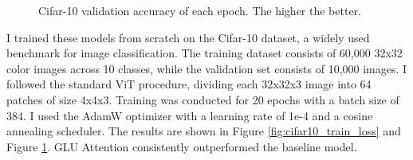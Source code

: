 \documentclass[11pt]{article}
\begin{document}
\begin{figure}[htbp]
\begin{minipage}{0.49\textwidth}
        \caption{Cifar-10 validation accuracy of each epoch. The higher the better.}
        \label{fig:cifar10_val_acc}
    \end{minipage}
\end{figure}

I trained these models from scratch on the Cifar-10 dataset, a widely used benchmark for image classification. The training dataset consists of 60,000 32x32 color images across 10 classes, while the validation set consists of 10,000 images. I followed the standard ViT\cite{dosovitskiy2021imageworth16x16words} procedure, dividing each 32x32x3 image into 64 patches of size 4x4x3. Training was conducted for 20 epochs with a batch size of 384. I used the AdamW optimizer with a learning rate of 1e-4 and a cosine annealing scheduler. The results are shown in Figure \ref{fig:cifar10_train_loss} and Figure \ref{fig:cifar10_val_acc}. GLU Attention consistently outperformed the baseline model.
\end{document}
